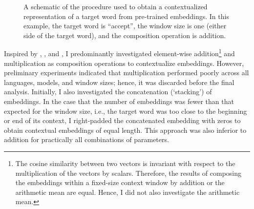 \begin{figure}
  \centering
  \newcommand*{\orawidest}{accept}
  \newcommand*{\oratallest}{\#\#}
  \newlength{\orawidth}
  \settowidth{\orawidth}{\orawidest}
  \newcommand*{\ora}[1]{\overrightarrow{#1\vphantom{\oratallest}}}
  \caption{A schematic of the procedure used to
    obtain a contextualized representation of a target word from pre-trained embeddings.
    In this example, the target word is ``accept'', the window size is one (either side of
    the target word), and the composition operation is addition.
  }
  \label{chart:schematic-procedure}
\end{figure}

Inspired by \textcite{Landauer1997}, \textcite{Kintsch2001}, and
\textcite{Mitchell2008}, I predominantly investigated element-wise addition\footnote{
  The cosine similarity between two vectors is invariant with respect to the
  multiplication of the vectors by scalars.
  Therefore, the results of composing the embeddings within a fixed-size context window
  by addition or the arithmetic mean are equal.
  Hence, I did not also investigate the arithmetic mean.
} and
multiplication as composition operations to contextualize embeddings.
However, preliminary experiments indicated that multiplication performed poorly across
all languages, models, and window sizes; hence, it was discarded before the final
analysis.
Initially, I also investigated the concatenation (`stacking') of embeddings.
In the case that the number of embeddings was fewer than that expected for the window
size, i.e., the target word was too close to the beginning or end of its context, I
right-padded the concatenated embedding with zeros to obtain contextual embeddings of
equal length.
This approach was also inferior to addition for practically all combinations of
parameters.

